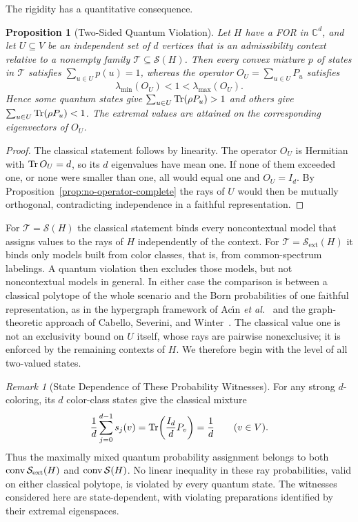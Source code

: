 \documentclass[aps,pra,reprint,superscriptaddress,longbibliography,nofootinbib,floatfix,10pt]{revtex4-2}
\newtheorem{proposition}[theorem]{Proposition}
\theoremstyle{definition}\newtheorem{definition}[theorem]{Definition}
\theoremstyle{remark}\newtheorem{remark}[theorem]{Remark}
\newcommand{\C}{\mathbb C}\newcommand{\R}{\mathbb R}\newcommand{\Q}{\mathbb Q}
\newcommand{\Sc}{\mathcal S}\newcommand{\Cc}{\mathcal C}\newcommand{\Wc}{\mathcal W}
\begin{document}
The rigidity has a quantitative consequence.
\begin{proposition}[Two-Sided Quantum Violation]\label{prop:two-sided}
Let $H$ have a FOR in $\C^d$, and let $U\subseteq V$ be an independent set of $d$ vertices that is an admissibility context relative to a nonempty family $\mathcal T\subseteq\Sc(H)$. Then every convex mixture $p$ of states in $\mathcal T$ satisfies $\sum_{u\in U}p(u)=1$, whereas the operator $O_U=\sum_{u\in U}P_u$ satisfies
\begin{equation}\label{eq:two-sided}
\lambda_{\min}(O_U)<1<\lambda_{\max}(O_U).
\end{equation}
Hence some quantum states give $\sum_{u\in U}\operatorname{Tr}(\rho P_u)>1$ and others give $\sum_{u\in U}\operatorname{Tr}(\rho P_u)<1$. The extremal values are attained on the corresponding eigenvectors of $O_U$.
\end{proposition}
\begin{proof}
The classical statement follows by linearity. The operator $O_U$ is Hermitian with $\operatorname{Tr} O_U=d$, so its $d$ eigenvalues have mean one. If none of them exceeded one, or none were smaller than one, all would equal one and $O_U=I_d$. By Proposition~\ref{prop:no-operator-complete} the rays of $U$ would then be mutually orthogonal, contradicting independence in a faithful representation.
\end{proof}
For $\mathcal T=\Sc(H)$ the classical statement binds every noncontextual model that assigns values to the rays of $H$ independently of the context. For $\mathcal T=\Sc_{\mathrm{ext}}(H)$ it binds only models built from color classes, that is, from common-spectrum labelings. A quantum violation then excludes those models, but not noncontextual models in general. In either case the comparison is between a classical polytope of the whole scenario and the Born probabilities of one faithful representation, as in the hypergraph framework of Ac\'{\i}n \emph{et al.}~\cite{acin-fritz-leverrier-sainz-2015} and the graph-theoretic approach of Cabello, Severini, and Winter~\cite{cabello-severini-winter-2014}. The classical value one is not an exclusivity bound on $U$ itself, whose rays are pairwise nonexclusive; it is enforced by the remaining contexts of $H$. We therefore begin with the level of all two-valued states.

\begin{remark}[State Dependence of These Probability Witnesses]\label{rem:state-dependent-witnesses}
For any strong $d$-coloring, its $d$ color-class states give the classical mixture
\begin{equation}\label{eq:classical-maximally-mixed-point}
\frac1d\sum_{j=0}^{d-1}s_j(v)
=\operatorname{Tr}\!\left(\frac{I_d}{d}P_v\right)=\frac1d
\qquad(v\in V).
\end{equation}
Thus the maximally mixed quantum probability assignment belongs to both $\conv\Sc_{\mathrm{ext}}(H)$ and $\conv\Sc(H)$. No linear inequality in these ray probabilities, valid on either classical polytope, is violated by every quantum state. The witnesses considered here are state-dependent, with violating preparations identified by their extremal eigenspaces.
\end{remark}
\end{document}

